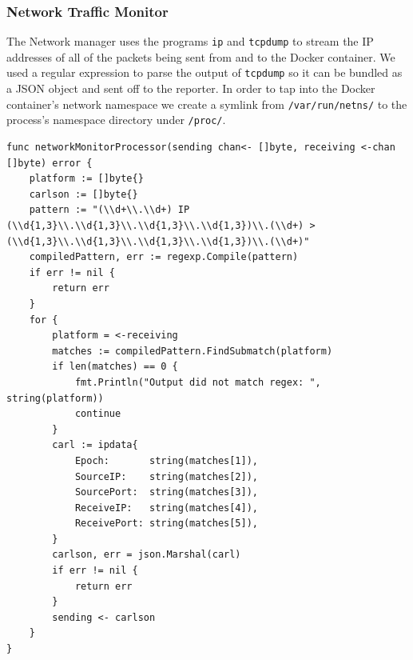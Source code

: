 \documentclass[10pt,conference,draftclsnofoot,onecolumn]{IEEEtran}
\begin{document}
\subsubsection{Network Traffic Monitor}
The Network manager uses the programs \texttt{ip} and \texttt{tcpdump} to stream the IP addresses of all of the packets being sent from and to the Docker container. We used a regular expression to parse the output of \texttt{tcpdump} so it can be bundled as a JSON object and sent off to the reporter. In order to tap into the Docker container’s network namespace we create a symlink from \texttt{/var/run/netns/} to the process’s namespace directory under \texttt{/proc/}.

\begin{lstlisting}
func networkMonitorProcessor(sending chan<- []byte, receiving <-chan []byte) error {
	platform := []byte{}
	carlson := []byte{}
	pattern := "(\\d+\\.\\d+) IP (\\d{1,3}\\.\\d{1,3}\\.\\d{1,3}\\.\\d{1,3})\\.(\\d+) > (\\d{1,3}\\.\\d{1,3}\\.\\d{1,3}\\.\\d{1,3})\\.(\\d+)"
	compiledPattern, err := regexp.Compile(pattern)
	if err != nil {
		return err
	}
	for {
		platform = <-receiving
		matches := compiledPattern.FindSubmatch(platform)
		if len(matches) == 0 {
			fmt.Println("Output did not match regex: ", string(platform))
			continue
		}
		carl := ipdata{
			Epoch:       string(matches[1]),
			SourceIP:    string(matches[2]),
			SourcePort:  string(matches[3]),
			ReceiveIP:   string(matches[4]),
			ReceivePort: string(matches[5]),
		}
		carlson, err = json.Marshal(carl)
		if err != nil {
			return err
		}
		sending <- carlson
	}
}
\end{lstlisting}
\end{document}
